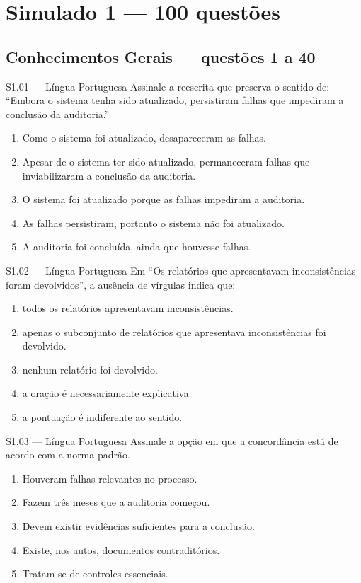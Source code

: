 \section{Simulado 1 — 100 questões}

\subsection*{Conhecimentos Gerais — questões 1 a 40}

\begin{questao}{S1.01 — Língua Portuguesa}
Assinale a reescrita que preserva o sentido de: ``Embora o sistema tenha sido atualizado, persistiram falhas que impediram a conclusão da auditoria.''
\begin{enumerate}[label=\Alph*)]
\item Como o sistema foi atualizado, desapareceram as falhas.
\item Apesar de o sistema ter sido atualizado, permaneceram falhas que inviabilizaram a conclusão da auditoria.
\item O sistema foi atualizado porque as falhas impediram a auditoria.
\item As falhas persistiram, portanto o sistema não foi atualizado.
\item A auditoria foi concluída, ainda que houvesse falhas.
\end{enumerate}
\end{questao}

\begin{questao}{S1.02 — Língua Portuguesa}
Em ``Os relatórios que apresentavam inconsistências foram devolvidos'', a ausência de vírgulas indica que:
\begin{enumerate}[label=\Alph*)]
\item todos os relatórios apresentavam inconsistências.
\item apenas o subconjunto de relatórios que apresentava inconsistências foi devolvido.
\item nenhum relatório foi devolvido.
\item a oração é necessariamente explicativa.
\item a pontuação é indiferente ao sentido.
\end{enumerate}
\end{questao}

\begin{questao}{S1.03 — Língua Portuguesa}
Assinale a opção em que a concordância está de acordo com a norma-padrão.
\begin{enumerate}[label=\Alph*)]
\item Houveram falhas relevantes no processo.
\item Fazem três meses que a auditoria começou.
\item Devem existir evidências suficientes para a conclusão.
\item Existe, nos autos, documentos contraditórios.
\item Tratam-se de controles essenciais.
\end{enumerate}
\end{questao}

